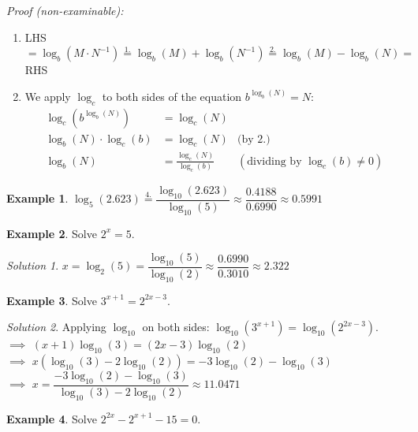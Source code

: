 \documentclass[
  english,
  12pt,
  oneside]{book}
\theoremstyle{definition}
\theoremstyle{definition}
\newtheorem{example}{Example}[chapter]
\theoremstyle{definition}
\theoremstyle{definition}
\theoremstyle{remark}
\newtheorem*{solution}{Solution}
\begin{document}
\emph{Proof (non-examinable):}

\begin{enumerate}
\def\labelenumi{\arabic{enumi}.}
\setcounter{enumi}{2}
\item
  LHS \(= \log_b(M\cdot N^{-1}) \stackrel{1.}{=} \log_b(M) + \log_b(N^{-1}) \stackrel{2.}{=} \log_b(M)-\log_b(N) =\) RHS
\item
  We apply \(\log_c\) to both sides of the equation \(b^{\log_b(N)}=N\):
  \begin{align*}
   \log_c\left(b^{\log_b(N)}\right) &= \log_c(N) & \\
   \log_b(N)\cdot \log_c(b) &= \log_c(N) & \text{(by 2.)}\\
   \log_b(N) &= \frac{\log_c(N)}{\log_c(b)} & (\text{dividing by }\log_c(b)\not=0)
  \end{align*}
\end{enumerate}

\begin{example}
\(\log_5(2.623) \stackrel{4.}{=} \dfrac{\log_{10}(2.623)}{\log_{10}(5)} \approx \dfrac{0.4188}{0.6990} \approx 0.5991\)
\end{example}

\begin{example}
Solve \(2^x =5\).
\end{example}

\begin{solution}
\(x=\log_2(5)=\dfrac{\log_{10}(5)}{\log_{10}(2)} \approx\dfrac{0.6990}{0.3010}\approx 2.322\)
\end{solution}

\begin{example}
Solve \(3^{x+1}=2^{2x-3}\).
\end{example}

\begin{solution}
Applying \(\log_{10}\) on both sides: \(\log_{10}(3^{x+1}) = \log_{10}(2^{2x-3})\).\\
\(\implies\) \((x+1)\log_{10}(3) = (2x-3)\log_{10}(2)\)\\
\(\implies\) \(x\left(\log_{10}(3)-2\log_{10}(2)\right) = -3\log_{10}(2)-\log_{10}(3)\)\\
\(\implies\) \(x=\dfrac{-3\log_{10}(2)-\log_{10}(3)}{\log_{10}(3)-2\log_{10}(2)}\approx 11.0471\)
\end{solution}

\begin{example}
Solve \(2^{2x}-2^{x+1}-15=0\).
\end{example}
\end{document}
